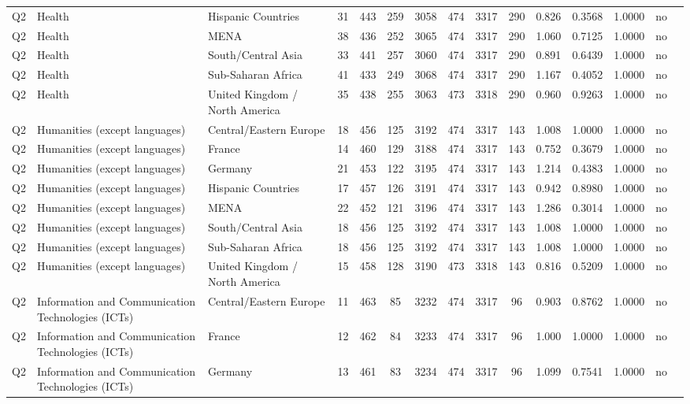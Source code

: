 \begin{longtable}{lllrcccccccccll}
Q2 & Health & Hispanic Countries & 31 & 443 & 259 & 3058 & 474 & 3317 & 290 & 0.826 & 0.3568 & 1.0000 & no \\
Q2 & Health & MENA & 38 & 436 & 252 & 3065 & 474 & 3317 & 290 & 1.060 & 0.7125 & 1.0000 & no \\
Q2 & Health & South/Central Asia & 33 & 441 & 257 & 3060 & 474 & 3317 & 290 & 0.891 & 0.6439 & 1.0000 & no \\
Q2 & Health & Sub-Saharan Africa & 41 & 433 & 249 & 3068 & 474 & 3317 & 290 & 1.167 & 0.4052 & 1.0000 & no \\
Q2 & Health & United Kingdom / North America & 35 & 438 & 255 & 3063 & 473 & 3318 & 290 & 0.960 & 0.9263 & 1.0000 & no \\
Q2 & Humanities (except languages) & Central/Eastern Europe & 18 & 456 & 125 & 3192 & 474 & 3317 & 143 & 1.008 & 1.0000 & 1.0000 & no \\
Q2 & Humanities (except languages) & France & 14 & 460 & 129 & 3188 & 474 & 3317 & 143 & 0.752 & 0.3679 & 1.0000 & no \\
Q2 & Humanities (except languages) & Germany & 21 & 453 & 122 & 3195 & 474 & 3317 & 143 & 1.214 & 0.4383 & 1.0000 & no \\
Q2 & Humanities (except languages) & Hispanic Countries & 17 & 457 & 126 & 3191 & 474 & 3317 & 143 & 0.942 & 0.8980 & 1.0000 & no \\
Q2 & Humanities (except languages) & MENA & 22 & 452 & 121 & 3196 & 474 & 3317 & 143 & 1.286 & 0.3014 & 1.0000 & no \\
Q2 & Humanities (except languages) & South/Central Asia & 18 & 456 & 125 & 3192 & 474 & 3317 & 143 & 1.008 & 1.0000 & 1.0000 & no \\
Q2 & Humanities (except languages) & Sub-Saharan Africa & 18 & 456 & 125 & 3192 & 474 & 3317 & 143 & 1.008 & 1.0000 & 1.0000 & no \\
Q2 & Humanities (except languages) & United Kingdom / North America & 15 & 458 & 128 & 3190 & 473 & 3318 & 143 & 0.816 & 0.5209 & 1.0000 & no \\
Q2 & Information and Communication Technologies (ICTs) & Central/Eastern Europe & 11 & 463 & 85 & 3232 & 474 & 3317 & 96 & 0.903 & 0.8762 & 1.0000 & no \\
Q2 & Information and Communication Technologies (ICTs) & France & 12 & 462 & 84 & 3233 & 474 & 3317 & 96 & 1.000 & 1.0000 & 1.0000 & no \\
Q2 & Information and Communication Technologies (ICTs) & Germany & 13 & 461 & 83 & 3234 & 474 & 3317 & 96 & 1.099 & 0.7541 & 1.0000 & no \\

\end{longtable}
